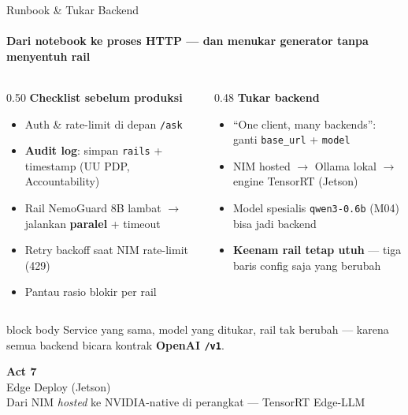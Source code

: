 \documentclass[aspectratio=169,t]{beamer}
\newcommand{\acttitle}[3]{%
  \begin{frame}[plain]
    \vspace{1.5cm}
    \begin{center}
      {\color{nvgreen}\Huge\bfseries Act #1}\\[1.2em]
      {\color{nvwhite}\Huge #2}\\[0.8em]
      {\color{nvgray}\Large #3}
    \end{center}
  \end{frame}%
}
\newcommand{\takeaway}[1]{%
  \vspace{0.3em}
  \begin{beamercolorbox}[rounded=true,shadow=false,sep=6pt]{block body}
    \centering\small\color{nvlightgreen}#1
  \end{beamercolorbox}%
}
\begin{document}
\begin{frame}{Runbook \& Tukar Backend}
  \framesubtitle{Dari notebook ke proses HTTP --- dan menukar generator tanpa menyentuh rail}
  \begin{columns}[T]
    \begin{column}{0.50\textwidth}
      \textcolor{nvgreen}{\textbf{Checklist sebelum produksi}}
      \begin{itemize}\footnotesize
        \item Auth \& rate-limit di depan \texttt{/ask}
        \item \textbf{Audit log}: simpan \texttt{rails} + timestamp (UU PDP, Accountability)
        \item Rail NemoGuard 8B lambat $\to$ jalankan \textbf{paralel} + timeout
        \item Retry backoff saat NIM rate-limit (429)
        \item Pantau rasio blokir per rail
      \end{itemize}
    \end{column}
    \begin{column}{0.48\textwidth}
      \textcolor{nvorange}{\textbf{Tukar backend}}
      \begin{itemize}\footnotesize
        \item ``One client, many backends'': ganti \texttt{base\_url} + \texttt{model}
        \item NIM hosted $\to$ Ollama lokal $\to$ engine TensorRT (Jetson)
        \item Model spesialis \texttt{qwen3-0.6b} (M04) bisa jadi backend
        \item \textbf{Keenam rail tetap utuh} --- tiga baris config saja yang berubah
      \end{itemize}
    \end{column}
  \end{columns}
  \takeaway{Service yang sama, model yang ditukar, rail tak berubah --- karena semua backend bicara kontrak \textbf{OpenAI \texttt{/v1}}.}
\end{frame}

\acttitle{7}{Edge Deploy (Jetson)}{Dari NIM \emph{hosted} ke NVIDIA-native di perangkat --- TensorRT Edge-LLM}
\end{document}
